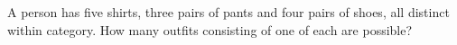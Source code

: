 A person has five shirts, three pairs of pants and four pairs of shoes, all distinct within category. How many outfits consisting of one of each are possible?
